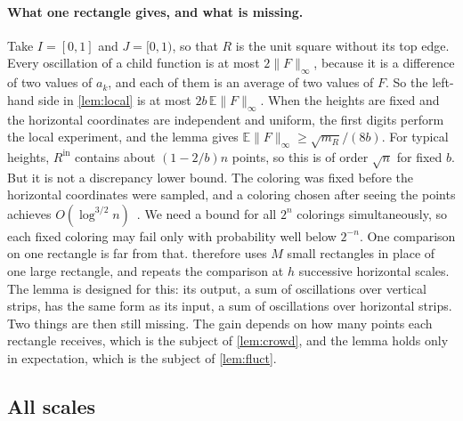 \documentclass[11pt,letterpaper]{article}
\newcommand{\E}{\mathbb{E}}
\newcommand{\1}{\mathbf{1}}
\newcommand{\Fnorm}[1]{\lVert #1\rVert_\infty}
\newcommand{\Rin}{R^{\mathrm{in}}}
\begin{document}
\paragraph{What one rectangle gives, and what is missing.}
Take $I=[0,1]$ and $J=[0,1)$, so that $R$ is the unit square without its top edge. Every oscillation of a child function is at most $2\Fnorm F$, because it is a difference of two values of $a_k$, and each of them is an average of two values of $F$. So the left-hand side in \cref{lem:local} is at most $2b\,\E\Fnorm F$. When the heights are fixed and the horizontal coordinates are independent and uniform, the first digits perform the local experiment, and the lemma gives $\E\Fnorm F\ge\sqrt{m_R}/(8b)$. For typical heights, $\Rin$ contains about $(1-2/b)n$ points, so this is of order $\sqrt n$ for fixed $b$. But it is not a discrepancy lower bound. The coloring was fixed before the horizontal coordinates were sampled, and a coloring chosen after seeing the points achieves $O(\log^{3/2}n)$~\cite{Nik17}. We need a bound for all $2^n$ colorings simultaneously, so each fixed coloring may fail only with probability well below $2^{-n}$. One comparison on one rectangle is far from that.  therefore uses $M$ small rectangles in place of one large rectangle, and repeats the comparison at $h$ successive horizontal scales. The lemma is designed for this: its output, a sum of oscillations over vertical strips, has the same form as its input, a sum of oscillations over horizontal strips. Two things are then still missing. The gain depends on how many points each rectangle receives, which is the subject of \cref{lem:crowd}, and the lemma holds only in expectation, which is the subject of \cref{lem:fluct}.

\subsection{All scales}\label{sec:scales}
\end{document}
